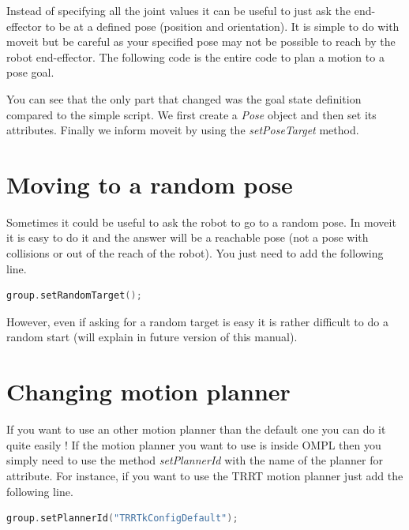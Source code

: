 Instead of specifying all the joint values it can be useful to just ask the end-effector to be at a defined pose (position and orientation). It is simple to do with moveit but be careful as your specified pose may not be possible to reach by the robot end-effector. The following code is the entire code to plan a motion to a pose goal.



You can see that the only part that changed was the goal state definition compared to the simple script. We first create a \emph{Pose} object and then set its attributes. Finally we inform moveit by using the \emph{setPoseTarget} method.

\section{Moving to a random pose}

Sometimes it could be useful to ask the robot to go to a random pose. In moveit it is easy to do it and the answer will be a reachable pose (not a pose with collisions or out of the reach of the robot). You just need to add the following line.

\begin{lstlisting}[language=c++]
group.setRandomTarget();
\end{lstlisting}

However, even if asking for a random target is easy it is rather difficult to do a random start (will explain in future version of this manual).

\section{Changing motion planner}

If you want to use an other motion planner than the default one you can do it quite easily ! If the motion planner you want to use is inside OMPL then you simply need to use the method \emph{setPlannerId} with the name of the planner for attribute. For instance, if you want to use the TRRT motion planner just add the following line.


\begin{lstlisting}[language=c++]
group.setPlannerId("TRRTkConfigDefault");
\end{lstlisting}

